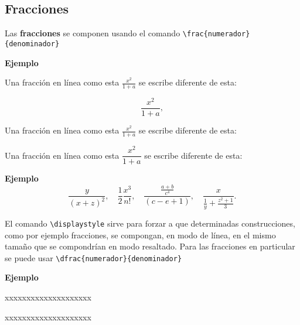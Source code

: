 \documentclass[10pt,a4paper]{report}
\begin{document}
\subsection{Fracciones}



Las {\bf fracciones} se componen usando el comando
\verb+\frac{numerador}{denominador}+


\bigskip
\textbf{Ejemplo}

Una fracción en línea como esta $\frac{x^2}{1+a}$ se escribe diferente de esta:

\begin{equation*}
\frac{x^2}{1+a},
\end{equation*}

Una fracción en línea como esta $\displaystyle\frac{x^2}{1+a}$ se escribe diferente de esta:

Una fracción en línea como esta $\dfrac{x^2}{1+a}$ se escribe diferente de esta:
\bigskip




\bigskip
\textbf{Ejemplo}
\begin{equation*}
\frac{y}{(x+z)^2},
\quad
\frac{1}{2}\frac{x^3}{n!},
\quad
\frac{\frac{a+b}{c^4}}{(c-e+1)},
\quad
\frac{x}{\frac{1}{y}+\frac{z^2+1}{3}}.
\end{equation*}



\bigskip




El comando
\verb+\displaystyle+ 
sirve para forzar a que determinadas construcciones, como por ejemplo fracciones,
se compongan, en modo de línea, en el mismo tamaño que se compondrían en modo resaltado.
Para las fracciones en particular se puede usar
\verb+\dfrac{numerador}{denominador}+



\bigskip
\textbf{Ejemplo}

xxxxxxxxxxxxxxxxxxxx

xxxxxxxxxxxxxxxxxxxx
\bigskip
\end{document}
